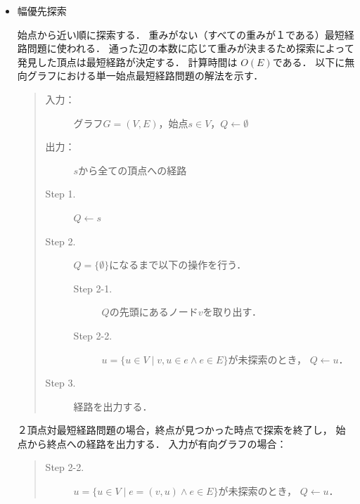 \documentclass[12pt]{optlab-bachelor}
\begin{document}
\begin{itemize}
  \item 幅優先探索

  始点から近い順に探索する．
  重みがない（すべての重みが１である）最短経路問題に使われる．
  通った辺の本数に応じて重みが決まるため探索によって発見した頂点は最短経路が決定する．
  計算時間は $O(E)$である．
  以下に無向グラフにおける単一始点最短経路問題の解法を示す．

  \begin{quote}
    \begin{description}
      \item[入力：] グラフ$G=(V,E)$，始点$s \in V$，$Q \leftarrow \emptyset$
      \item[出力：] $s$から全ての頂点への経路
      \item[Step 1.] $Q \leftarrow s$
      \item[Step 2.] $Q = \{\emptyset\}$になるまで以下の操作を行う．
      \begin{description}
        \item[Step 2-1.] $Q$の先頭にあるノード$v$を取り出す．
        \item[Step 2-2.] $u = \{u \in V \mid v,u \in e \land e \in E\}$が未探索のとき，
        $Q \leftarrow u$．
      \end{description}

      \item[Step 3.] 経路を出力する．
    \end{description}
  \end{quote}
  ２頂点対最短経路問題の場合，終点が見つかった時点で探索を終了し，
  始点から終点への経路を出力する．
  入力が有向グラフの場合：
  \begin{quote}
    \begin{description}
      \item[Step 2-2.] $u = \{u \in V \mid e = (v,u) \land e \in E\}$が未探索のとき，
      $Q \leftarrow u$．
    \end{description}
  \end{quote}
\end{itemize}
\end{document}
